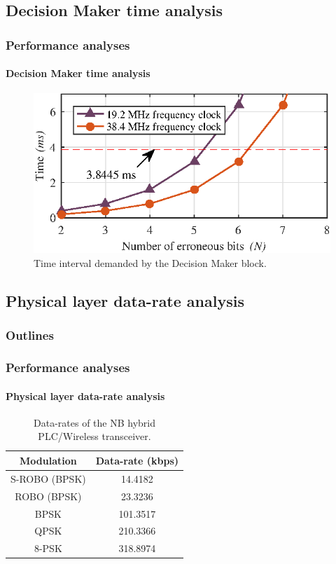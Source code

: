 \documentclass[mathserif]{beamer}
\begin{document}
\subsection{Decision Maker time analysis}
\begin{frame}
	\frametitle{Performance analyses}
	\framesubtitle{Decision Maker time analysis}
	\begin{figure}[ht]
		\centering
		\includegraphics[width=0.9\linewidth]{figuras/decision_maker}
		\caption{Time interval demanded by the Decision Maker block.}
		\label{fig:decisionmaker}
	\end{figure}
\end{frame}

\subsection{Physical layer data-rate analysis}
\begin{frame}
\frametitle{Outlines}
\small
\tableofcontents[currentsubsection]
\end{frame}

\begin{frame}
	\frametitle{Performance analyses}
	\framesubtitle{Physical layer data-rate analysis}
	\begin{table}[ht]
		\centering
		\caption{Data-rates of the NB hybrid PLC/Wireless transceiver.}
		\label{tab:data_rate}
		\begin{tabular}{c|c}
			\hline
			Modulation 			& Data-rate (kbps)  \\ \hline\hline
			S-ROBO (BPSK)    	& 14.4182          	\\ \hline
			ROBO (BPSK)       	& 23.3236          	\\ \hline
			BPSK       			& 101.3517         	\\ \hline
			QPSK       			& 210.3366         	\\ \hline
			8-PSK       			& 318.8974         	\\ \hline
		\end{tabular}
	\end{table}
\end{frame}
\end{document}
